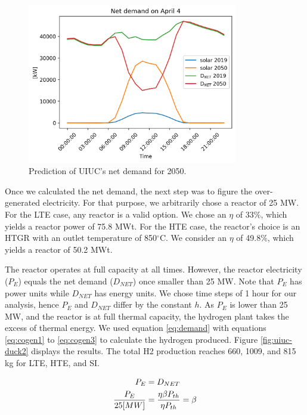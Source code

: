 \begin{figure}[htbp!]
		\centering
	\includegraphics[height=7cm]{figures-hydro/uiuc-duck}
	\hfill
	\caption{Prediction of \gls{UIUC}'s net demand for 2050.}
	\label{fig:uiuc-duck1}
\end{figure}

Once we calculated the net demand, the next step was to figure the over-generated electricity.
For that purpose, we arbitrarily chose a reactor of 25 MW.
For the \gls{LTE} case, any reactor is a valid option.
We chose an $\eta$ of 33$\%$, which yields a reactor power of 75.8 MWt.
For the \gls{HTE} case, the reactor's choice is an HTGR with an outlet temperature of 850$^{\circ}$C.
We consider an $\eta$ of 49.8$\%$, which yields a reactor of 50.2 MWt.

The reactor operates at full capacity at all times.
However, the reactor electricity ($P_{E}$) equals the net demand ($D_{NET}$) once smaller than 25 MW.
Note that $P_{E}$ has power units while $D_{NET}$ has energy units.
We chose time steps of 1 hour for our analysis, hence $P_{E}$ and $D_{NET}$ differ by the constant $h$.
As $P_{E}$ is lower than 25 MW, and the reactor is at full thermal capacity, the hydrogen plant takes the excess of thermal energy.
We used equation \ref{eq:demand} with equations \ref{eq:cogen1} to \ref{eq:cogen3} to calculate the hydrogen produced.
Figure \ref{fig:uiuc-duck2} displays the results.
The total \gls{H2} production reaches 660, 1009, and 815 kg for \gls{LTE}, \gls{HTE}, and \gls{SI}.

\begin{align}
	P_{E} &= D_{NET}  \notag \\
  	\frac{P_E}{25 [MW]} &= \frac{\eta \beta P_{th}}{\eta P_{th}} = \beta
  	\label{eq:demand}
\end{align}

